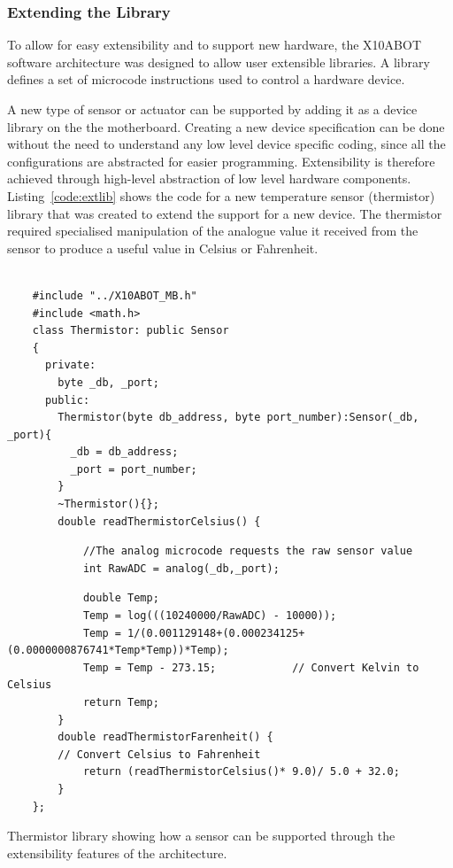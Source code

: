 	\subsubsection{Extending the Library} %
	\label{ssub:extending_the_library}
	
	To allow for easy extensibility and to support new hardware, the X10ABOT software architecture was designed to allow user extensible libraries. A library defines a set of microcode instructions used to control a hardware device.
	
	A new type of sensor or actuator can be supported by adding it as a device library on the the \xten motherboard. Creating a new device specification can be done without the need to understand any low level device specific coding, since all the configurations are abstracted for easier programming. Extensibility is therefore achieved through high-level abstraction of low level hardware components.
    Listing~\ref{code:extlib} shows the code for a new temperature sensor (thermistor) library that was created to extend the \xten support for a new device. The thermistor required specialised manipulation of the analogue value it received from the sensor to produce a useful value in Celsius or Fahrenheit.
    
    \begin{listing}
    \footnotesize
    {\fontsize{8}{6}\selectfont
    \begin{verbatim}

    #include "../X10ABOT_MB.h"
    #include <math.h>
    class Thermistor: public Sensor
    {
      private:
        byte _db, _port;
      public:
        Thermistor(byte db_address, byte port_number):Sensor(_db, _port){
          _db = db_address;
          _port = port_number;
        }
        ~Thermistor(){};
        double readThermistorCelsius() {
        \end{verbatim}
        \begin{verbatim}
            //The analog microcode requests the raw sensor value
            int RawADC = analog(_db,_port); 
        \end{verbatim}
        \begin{verbatim}
            double Temp;
            Temp = log(((10240000/RawADC) - 10000));
            Temp = 1/(0.001129148+(0.000234125+(0.0000000876741*Temp*Temp))*Temp);
            Temp = Temp - 273.15;            // Convert Kelvin to Celsius
            return Temp;
        }
        double readThermistorFarenheit() {
        // Convert Celsius to Fahrenheit
            return (readThermistorCelsius()* 9.0)/ 5.0 + 32.0;
        }
    };

    \end{verbatim}
    }
    \caption{Thermistor library showing how a sensor can be supported through the extensibility features of the \xten architecture.} \label{code:extlib}
    \end{listing}
    
